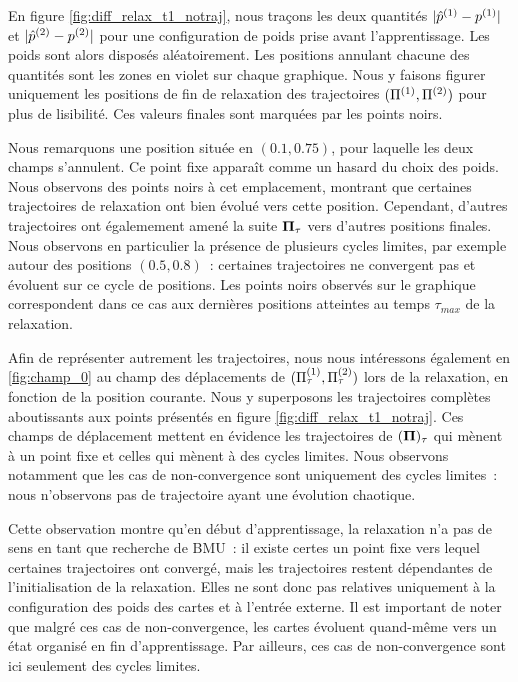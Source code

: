 \documentclass[../main]{subfiles}
\begin{document}
En figure \ref{fig:diff_relax_t1_notraj}, nous traçons les deux quantités $\lvert \hat{p}^{({1})} - p^{({1})} \rvert$ et $\lvert \hat{p}^{({2})} - p^{({2})}\rvert$ pour une configuration de poids prise avant l'apprentissage. Les poids sont alors disposés aléatoirement.
Les positions annulant chacune des quantités sont les zones en violet sur chaque graphique.
Nous y faisons figurer uniquement les positions de fin de relaxation des trajectoires $(\Pi^{({1})},\Pi^{({2})})$ pour plus de lisibilité. Ces valeurs finales sont marquées par les points noirs.

Nous remarquons une position située en $(0.1, 0.75)$, pour laquelle les deux champs s'annulent. Ce point fixe apparaît comme un hasard du choix des poids.
Nous observons des points noirs à cet emplacement, montrant que certaines trajectoires de relaxation ont bien évolué vers cette position. 
Cependant, d'autres trajectoires ont égalemement amené la suite $\mathbf{\Pi}_\tau$ vers d'autres positions finales.
Nous observons en particulier la présence de plusieurs cycles limites, par exemple autour des positions $(0.5, 0.8)$~: certaines trajectoires ne convergent pas et évoluent sur ce cycle de positions. Les points noirs observés sur le graphique correspondent dans ce cas aux dernières positions atteintes au temps $\tau_{max}$ de la relaxation.

Afin de représenter autrement les trajectoires, nous nous intéressons également en \ref{fig:champ_0} au champ des déplacements de $(\Pi^{({1})}_\tau,\Pi^{({2})}_\tau)$ lors de la relaxation, en fonction de la position courante. 
Nous y superposons les trajectoires complètes aboutissants aux points présentés en figure \ref{fig:diff_relax_t1_notraj}.
Ces champs de déplacement mettent en évidence les trajectoires de $(\mathbf{\Pi})_\tau$ qui mènent à un point fixe et celles qui mènent à des cycles limites.
Nous observons notamment que les cas de non-convergence sont uniquement des cycles limites~: nous n'observons pas de trajectoire ayant une évolution chaotique.

Cette observation montre qu'en début d'apprentissage, la relaxation n'a pas de sens en tant que recherche de BMU~: il existe certes un point fixe vers lequel certaines trajectoires ont convergé, mais les trajectoires restent dépendantes de l'initialisation de la relaxation. 
Elles ne sont donc pas relatives uniquement à la configuration des poids des cartes et à l'entrée externe.
Il est important de noter que malgré ces cas de non-convergence, les cartes évoluent quand-même vers un état organisé en fin d'apprentissage. Par ailleurs, ces cas de non-convergence sont ici seulement des cycles limites.
\end{document}
